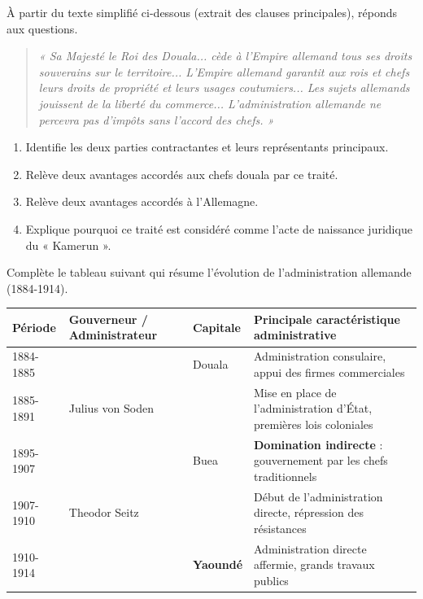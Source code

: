 \documentclass[11pt]{article}
\newcounter{popsec}
\newcounter{popsub}
\newcommand{\courssub}[1]{%
  \stepcounter{popsub}%
  \par\vspace{9pt}\noindent{\popxbold\fontsize{11.5}{13}\selectfont\color{popink}{\color{poporange}\thepopsec.\thepopsub}\hspace{6pt}#1}\par\nopagebreak\vspace{4pt}
}
\begin{document}
\courssub{Je m'entraîne}

\begin{exercice}
À partir du texte simplifié ci-dessous (extrait des clauses principales), réponds aux questions.
\begin{quote}
\textit{« Sa Majesté le Roi des Douala... cède à l'Empire allemand tous ses droits souverains sur le territoire... L'Empire allemand garantit aux rois et chefs leurs droits de propriété et leurs usages coutumiers... Les sujets allemands jouissent de la liberté du commerce... L'administration allemande ne percevra pas d'impôts sans l'accord des chefs. »}
\end{quote}
\begin{enumerate}
    \item Identifie les deux parties contractantes et leurs représentants principaux.
    \item Relève deux avantages accordés aux chefs douala par ce traité.
    \item Relève deux avantages accordés à l'Allemagne.
    \item Explique pourquoi ce traité est considéré comme l'acte de naissance juridique du « Kamerun ».
\end{enumerate}
\end{exercice}

\begin{exercice}
Complète le tableau suivant qui résume l'évolution de l'administration allemande (1884-1914).
\begin{center}
\begin{tabularx}{\linewidth}{|l|X|X|X|}\hline
\rowcolor{popblueL}\textbf{Période} & \textbf{Gouverneur / Administrateur} & \textbf{Capitale} & \textbf{Principale caractéristique administrative} \\ \hline
1884-1885 & & Douala & Administration consulaire, appui des firmes commerciales \\ \hline
1885-1891 & Julius von Soden & & Mise en place de l'administration d'État, premières lois coloniales \\ \hline
1895-1907 & & Buea & \textbf{Domination indirecte} : gouvernement par les chefs traditionnels \\ \hline
1907-1910 & Theodor Seitz & & Début de l'administration directe, répression des résistances \\ \hline
1910-1914 & & \textbf{Yaoundé} & Administration directe affermie, grands travaux publics \\ \hline
\end{tabularx}
\end{center}
\end{exercice}
\end{document}
